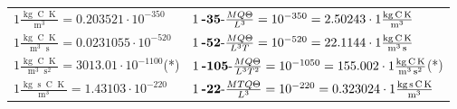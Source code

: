 \begin{center}
\begin{longtable}{l l}
{\color{black}$1 \bm{\mathrm{ }}\frac{\operatorname{kg}\operatorname{C}\operatorname{K}}{\operatorname{m}^3} = 0.203521\cdot10^{-350} $}&
	{\color{black}$1\:\text{\textbf{-35}-} \frac{MQ\Theta}{L^3}=10^{-350} = 2.50243 \cdot 1 \bm{\mathrm{ }}\frac{\operatorname{kg}\operatorname{C}\operatorname{K}}{\operatorname{m}^3}$}\\
{\color{black}$1 \bm{\mathrm{ }}\frac{\operatorname{kg}\operatorname{C}\operatorname{K}}{\operatorname{m}^3\operatorname{s}} = 0.0231055\cdot10^{-520} $}&
	{\color{black}$1\:\text{\textbf{-52}-} \frac{MQ\Theta}{L^3T}=10^{-520} = 22.1144 \cdot 1 \bm{\mathrm{ }}\frac{\operatorname{kg}\operatorname{C}\operatorname{K}}{\operatorname{m}^3\operatorname{s}}$}\\
{\color{black}$1 \bm{\mathrm{ }}\frac{\operatorname{kg}\operatorname{C}\operatorname{K}}{\operatorname{m}^3\operatorname{s}^2} = 3013.01\cdot10^{-1100} $}\quad(*)&
	{\color{black}$1\:\text{\textbf{-105}-} \frac{MQ\Theta}{L^3T^2}=10^{-1050} = 155.002 \cdot 1 \bm{\mathrm{ }}\frac{\operatorname{kg}\operatorname{C}\operatorname{K}}{\operatorname{m}^3\operatorname{s}^2}$}\quad(*)\\
{\color{black}$1 \bm{\mathrm{ }}\frac{\operatorname{kg}\operatorname{s}\operatorname{C}\operatorname{K}}{\operatorname{m}^3} = 1.43103\cdot10^{-220} $}&
	{\color{black}$1\:\text{\textbf{-22}-} \frac{MTQ\Theta}{L^3}=10^{-220} = 0.323024 \cdot 1 \bm{\mathrm{ }}\frac{\operatorname{kg}\operatorname{s}\operatorname{C}\operatorname{K}}{\operatorname{m}^3}$}\\


\end{longtable}
\end{center}
